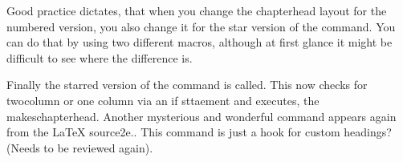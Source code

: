 
\begin{teXXX}
\def\@chapter[#1]#2{
    \ifnum \c@secnumdepth >\m@ne
       \if@mainmatter
             \refstepcounter{chapter}%
             \typeout{\@chapapp\space\thechapter.}%
             \addcontentsline{toc}{chapter}%
             {\protect\numberline{\thechapter}#1}%
       \else
             \addcontentsline{toc}{chapter}{#1}%
      \fi
   \else
         \addcontentsline{toc}{chapter}{#1}%
   \fi
   \chaptermark{#1}%
   \addtocontents{lof}{\protect\addvspace{10\p@}}%
   \addtocontents{lot}{\protect\addvspace{10\p@}}%
   \if@twocolumn
        \@topnewpage[\@makechapterhead{#2}]%
   \else
        \@makechapterhead{#2}%
        \@afterheading
   \fi}
\end{teXXX}

\begin{multicols}{2}

Good practice dictates, that when you change the chapterhead layout for the numbered version, you also change it for the star version of the command. You can do that by using two different macros, although at first glance it might be difficult to see where the difference is.
\end{multicols}


\begin{teXXX}
\def\@makechapterhead
\def\@makeschapterhead
\end{teXXX}

\begin{teXXX}
\def\@makechapterhead#1{%
  \vspace*{50\p@}%
  {\parindent \z@ \raggedright \normalfont
    \ifnum \c@secnumdepth >\m@ne
      \if@mainmatter
        \huge\bfseries \@chapapp\space \thechapter
        \par\nobreak
        \vskip 20\p@
      \fi
    \fi
    \interlinepenalty\@M
    \Huge \bfseries #1\par\nobreak
    \vskip 40\p@
  }}
\end{teXXX}

\begin{multicols}{2}
Finally the starred version of the command is called. This now checks for twocolumn or one column via an if sttaement and executes, the makeschapterhead. Another mysterious and wonderful command appears again from the LaTeX source2e.\cmd{\@afterheading}. This command 
is just a hook for custom headings? (Needs to be reviewed again).
\end{multicols}

